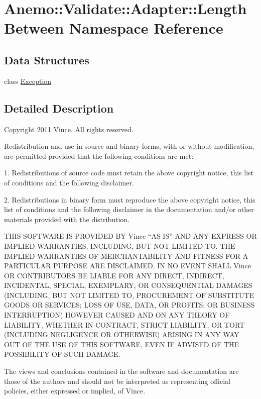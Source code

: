 \hypertarget{namespace_anemo_1_1_validate_1_1_adapter_1_1_length_between}{
\section{Anemo::Validate::Adapter::LengthBetween Namespace Reference}
\label{namespace_anemo_1_1_validate_1_1_adapter_1_1_length_between}
}
\subsection*{Data Structures}
\begin{DoxyCompactItemize}
\item 
class \hyperlink{class_anemo_1_1_validate_1_1_adapter_1_1_length_between_1_1_exception}{Exception}
\end{DoxyCompactItemize}


\subsection{Detailed Description}
Copyright 2011 Vince. All rights reserved.

Redistribution and use in source and binary forms, with or without modification, are permitted provided that the following conditions are met:

1. Redistributions of source code must retain the above copyright notice, this list of conditions and the following disclaimer.

2. Redistributions in binary form must reproduce the above copyright notice, this list of conditions and the following disclaimer in the documentation and/or other materials provided with the distribution.

THIS SOFTWARE IS PROVIDED BY Vince ``AS IS'' AND ANY EXPRESS OR IMPLIED WARRANTIES, INCLUDING, BUT NOT LIMITED TO, THE IMPLIED WARRANTIES OF MERCHANTABILITY AND FITNESS FOR A PARTICULAR PURPOSE ARE DISCLAIMED. IN NO EVENT SHALL Vince OR CONTRIBUTORS BE LIABLE FOR ANY DIRECT, INDIRECT, INCIDENTAL, SPECIAL, EXEMPLARY, OR CONSEQUENTIAL DAMAGES (INCLUDING, BUT NOT LIMITED TO, PROCUREMENT OF SUBSTITUTE GOODS OR SERVICES; LOSS OF USE, DATA, OR PROFITS; OR BUSINESS INTERRUPTION) HOWEVER CAUSED AND ON ANY THEORY OF LIABILITY, WHETHER IN CONTRACT, STRICT LIABILITY, OR TORT (INCLUDING NEGLIGENCE OR OTHERWISE) ARISING IN ANY WAY OUT OF THE USE OF THIS SOFTWARE, EVEN IF ADVISED OF THE POSSIBILITY OF SUCH DAMAGE.

The views and conclusions contained in the software and documentation are those of the authors and should not be interpreted as representing official policies, either expressed or implied, of Vince. 